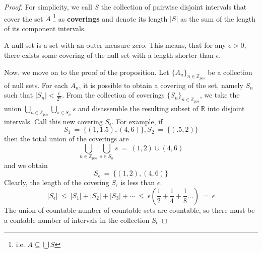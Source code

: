 \documentclass{article}
\newcommand{\RR}{\mathbb{R}}
\newcommand{\Zpos}{\mathbb{Z}_{pos}}
\begin{document}
\begin{proof}
    For simplicity, we call $S$ the collection of pairwise disjoint 
    intervals that cover the set $A$ 
     \footnote{i.e. $A \subseteq \bigcup S$} as \textbf{coverings}
    and denote its length $|S|$ as the sum of the length of its component intervals. 

    A null set is a set with an outer measure zero. This means, that for any $\epsilon >0$, there exists some covering of the null set with a length shorter than $\epsilon$. 

    Now, we move on to the proof of the proposition. Let $\{A_n\}_{n \in \Zpos}$ be a collection of null sets. For each $A_n$, it is possible to obtain a covering of the set, namely $S_n$ such that $|S_n| < \frac \epsilon {2^n}$. From the collection of coverings 
    $\{S_n\}_{n \in \Zpos}$, we take the union $\bigcup_{n \in \Zpos} \bigcup_{s \in S_n} s$ and disassemble the resulting subset of $\RR$ into disjoint intervals. Call this new covering $S_\epsilon$. For example, if 
    \begin{equation}
        S_1 \ = \ \{(1, 1.5), (4, 6)\}, S_2 \ = \ \{(.5, 2)\}
    \end{equation}
    then the total union of the coverings are 
    \begin{equation}
        \bigcup_{n \in \Zpos} \bigcup_{s \in S_n} s \ = \ 
        (1,2) \cup (4, 6)
    \end{equation}
    and we obtain 
    \begin{equation}
        S_\epsilon \ =\ \{(1, 2), (4, 6)\}
    \end{equation}
    Clearly, the length of the covering $S_\epsilon$ is less than $\epsilon$. 
    \begin{equation}
        |S_\epsilon| \ \leq \ |S_1| + |S_2| + |S_3| + \cdots \ \leq \ 
        \epsilon \left(
            \frac 1 2 + \frac 1 4 + \frac 1 8 \dots 
        \right) \ = \ \epsilon
    \end{equation}
    The union of countable number of countable sets are countable, so there must be a contable number of intervals in the collection $S_\epsilon$
\end{proof}
\end{document}

